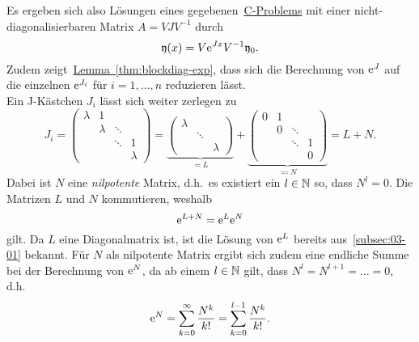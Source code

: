 Es ergeben sich also Lösungen eines gegebenen~\hyperref[eq:cp]{C-Problems} mit einer nicht-diagonalisierbaren Matrix $A = V J V^{-1}$ durch
\begin{equation*}
    \mathfrak{y}(x) = V \mathrm{e}^{J x} V^{-1} \mathfrak{y}_0.
\end{equation*}
Zudem zeigt~\hyperref[thm:blockdiag-exp]{Lemma~\ref*{thm:blockdiag-exp}},
dass sich die Berechnung von $\mathrm{e}^J$ auf die einzelnen $\mathrm{e}^{J_i}$ für $i = 1,\dots,n$ reduzieren lässt.\\
Ein J-Kästchen $J_i$ lässt sich weiter zerlegen zu
\begin{equation*}
    J_i = \begin{pmatrix}
              \lambda   & 1       &        & \\
                        & \lambda & \ddots & \\
                        &         & \ddots & 1 \\
                        &         &        & \lambda
    \end{pmatrix}
    = \underbrace{\begin{pmatrix}
        \lambda  &        & \\
                 & \ddots & \\
                 &        & \lambda
    \end{pmatrix}}_{= L}
    + \underbrace{\begin{pmatrix}
          0 & 1 &        & \\
            & 0 & \ddots & \\
            &   & \ddots & 1 \\
            &   &        & 0
    \end{pmatrix}}_{\eqqcolon N}
    = L + N.
\end{equation*}
Dabei ist $N$ eine \emph{nilpotente} Matrix, d.h.\ es existiert ein $l \in \mathbb{N}$ so, dass $N^l = 0$.
Die Matrizen $L$ und $N$ kommutieren, weshalb
\begin{equation*}
    \mathrm{e}^{L + N} = \mathrm{e}^L \mathrm{e}^N
\end{equation*}
gilt.
Da $L$ eine Diagonalmatrix ist, ist die Lösung von $\mathrm{e}^L$ bereits aus~\autoref{subsec:03-01} bekannt.
Für $N$ als nilpotente Matrix ergibt sich zudem eine endliche Summe bei der Berechnung von $\mathrm{e}^N$,
da ab einem $l \in \mathbb{N}$ gilt, dass $N^l = N^{l+1} = \dots = 0$, d.h.
\begin{equation*}
    \mathrm{e}^N
    = \sum^\infty_{k=0} \frac{N^k}{k!}
    = \sum^{l-1}_{k=0} \frac{N^k}{k!}.
\end{equation*}